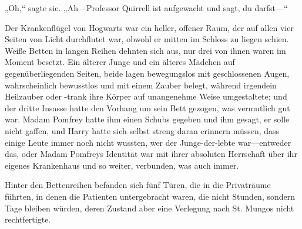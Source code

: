 „Oh,“ sagte sie. „Ah—Professor Quirrell ist aufgewacht und sagt, du darfst—“

\later

Der Krankenflügel von Hogwarts war ein heller, offener Raum, der auf allen vier Seiten von Licht durchflutet war, obwohl er mitten im Schloss zu liegen schien. Weiße Betten in langen Reihen dehnten sich aus, nur drei von ihnen waren im Moment besetzt. Ein älterer Junge und ein älteres Mädchen auf gegenüberliegenden Seiten, beide lagen bewegungslos mit geschlossenen Augen, wahrscheinlich bewusstlos und mit einem Zauber belegt, während irgendein Heilzauber oder -trank ihre Körper auf unangenehme Weise umgestaltete; und der dritte Insasse hatte den Vorhang um sein Bett gezogen, was vermutlich gut war. Madam Pomfrey hatte ihm einen Schubs gegeben und ihm gesagt, er solle nicht gaffen, und Harry hatte sich selbst streng daran erinnern müssen, dass einige Leute immer noch nicht wussten, wer der Junge-der-lebte war—entweder das, oder Madam Pomfreys Identität war mit ihrer absoluten Herrschaft über ihr eigenes Krankenhaus und so weiter, verbunden, was auch immer.

Hinter den Bettenreihen befanden sich fünf Türen, die in die Privaträume führten, in denen die Patienten untergebracht waren, die nicht Stunden, sondern Tage bleiben würden, deren Zustand aber eine Verlegung nach St. Mungos nicht rechtfertigte.

